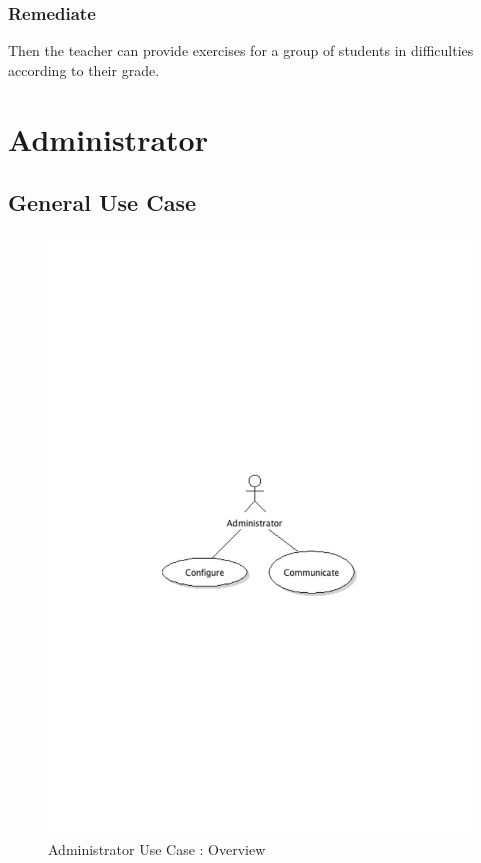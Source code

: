 		\subsubsection{Remediate}
			Then the teacher can provide exercises for a group of students in difficulties according to their grade.
\newpage
\section{Administrator}
	\subsection{General Use Case}
		\begin{figure}[ht]
			\begin{center}
				\includegraphics[width=\textwidth, trim=2cm 10cm 2cm 11cm]{UML_figure/UC/administrator/UC_Administrator_General.pdf}
				\caption{Administrator Use Case : Overview}
			\end{center}
		\end{figure}
